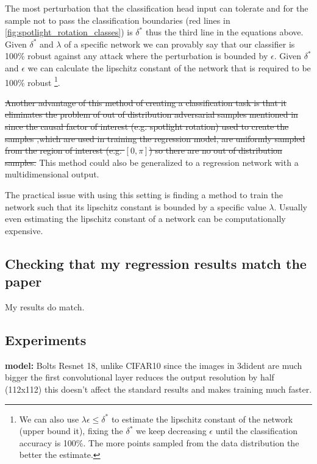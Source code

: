 \documentclass[../thesis.tex]{subfiles}
\begin{document}
The most perturbation that the classification head input can tolerate and for the sample not to pass the classification boundaries (red lines in \ref{fig:spotlight_rotation_classes}) is $\delta^*$ thus the third line in the equations above. Given $\delta^*$ and $\lambda$ of a specific network we can provably say that our classifier is 100\% robust against any attack where the perturbation is bounded by $\epsilon$. Given $\delta^*$ and $\epsilon$ we can calculate the lipschitz constant of the network that is required to be 100\% robust
\footnote{ We can also use $\lambda  \epsilon \leq \delta^*$ to estimate the lipschitz constant of the network (upper bound it), fixing the $\delta^*$ we keep decreasing $\epsilon$ until the classification accuracy is 100\%. The more points sampled from the data distribution the better the estimate.}.

\sout{Another advantage of this method of creating a classification task is that it eliminates the problem of out of distribution adversarial samples mentioned in \cite{on_manifold_off_manifold} since the causal factor of interest (e.g. spotlight rotation) used to create the samples ,which are used in training the regression model, are uniformly sampled from the region of interest (e.g. $[0,\pi]$) so there are no out of distribution samples.} This method could also be generalized to a regression network with a multidimensional output.  

The practical issue with using this setting is finding a method to train the network such that its lipschitz constant is bounded by a specific value $\lambda$. Usually even estimating the lipschitz constant of a network can be computationally expensive. 





\subsection{Checking that my regression results match the paper}
My results do match.


\subsection{Experiments}

\textbf{model:} Bolts Resnet 18, unlike CIFAR10 since the images in 3dident are much bigger the first convolutional layer reduces the output resolution by half (112x112) this doesn't affect the standard results and makes training much faster. 
\end{document}
